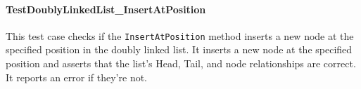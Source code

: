 
\paragraph{TestDoublyLinkedList\_InsertAtPosition}
This test case checks if the \lstinline{InsertAtPosition} method inserts a new node at the specified position in the doubly linked list. It inserts a new node at the specified position and asserts that the list's Head, Tail, and node relationships are correct. It reports an error if they're not.



